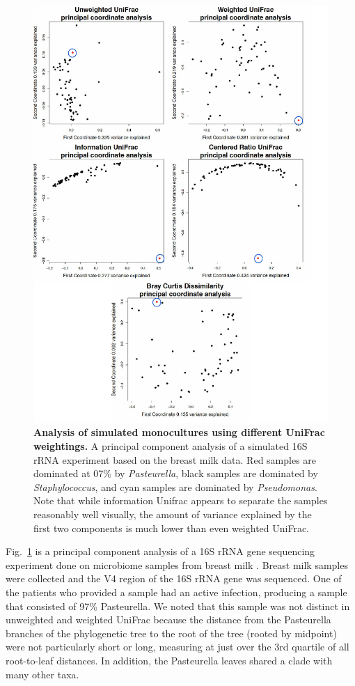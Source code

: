 \documentclass[10pt,letterpaper]{article}
\begin{document}
\begin{figure}[h]
\includegraphics[scale=0.8]{breastmilk.eps}
\caption{{\bf Analysis of simulated monocultures using different UniFrac weightings. }
A principal component analysis of a simulated 16S rRNA experiment based on the breast milk data. Red samples are dominated at 07\% by \textit{Pasteurella}, black samples are dominated by \textit{Staphylococcus}, and cyan samples are dominated by \textit{Pseudomonas}. Note that while information Unifrac appears to separate the samples reasonably well visually, the amount of variance explained by the first two components is much lower than even weighted UniFrac.}
\label{fig7}
\end{figure}

Fig.~\ref{fig7} is a principal component analysis of a 16S rRNA gene sequencing experiment done on microbiome samples from breast milk \cite{urbaniak2016human}. Breast milk samples were collected and the V4 region of the 16S rRNA gene was sequenced. One of the patients who provided a sample had an active infection, producing a sample that consisted of 97\% Pasteurella. We noted that this sample was not distinct in unweighted and weighted UniFrac because the distance from the Pasteurella branches of the phylogenetic tree to the root of the tree (rooted by midpoint) were not particularly short or long, measuring at just over the 3rd quartile of all root-to-leaf distances. In addition, the Pasteurella leaves shared a clade with many other taxa.
\end{document}
